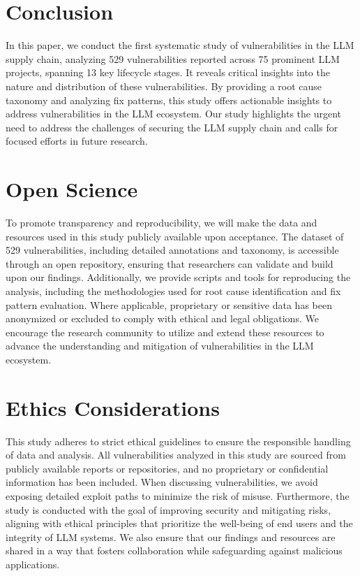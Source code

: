 \section{Conclusion}
In this paper, we conduct the first systematic study of vulnerabilities in the LLM supply chain, analyzing 529 vulnerabilities reported across 75 prominent LLM projects, spanning 13 key lifecycle stages. It reveals critical insights into the nature and distribution of these vulnerabilities. By providing a root cause taxonomy and analyzing fix patterns, this study offers actionable insights to address vulnerabilities in the LLM ecosystem. Our study highlights the urgent need to address the challenges of securing the LLM supply chain and calls for focused efforts in future research.

\section*{Open Science}
To promote transparency and reproducibility, we will make the data and resources used in this study publicly available upon acceptance. The dataset of 529 vulnerabilities, including detailed annotations and taxonomy, is accessible through an open repository, ensuring that researchers can validate and build upon our findings. Additionally, we provide scripts and tools for reproducing the analysis, including the methodologies used for root cause identification and fix pattern evaluation. Where applicable, proprietary or sensitive data has been anonymized or excluded to comply with ethical and legal obligations. We encourage the research community to utilize and extend these resources to advance the understanding and mitigation of vulnerabilities in the LLM ecosystem.

\section*{Ethics Considerations}
This study adheres to strict ethical guidelines to ensure the responsible handling of data and analysis. All vulnerabilities analyzed in this study are sourced from publicly available reports or repositories, and no proprietary or confidential information has been included. When discussing vulnerabilities, we avoid exposing detailed exploit paths to minimize the risk of misuse. Furthermore, the study is conducted with the goal of improving security and mitigating risks, aligning with ethical principles that prioritize the well-being of end users and the integrity of LLM systems. We also ensure that our findings and resources are shared in a way that fosters collaboration while safeguarding against malicious applications.
